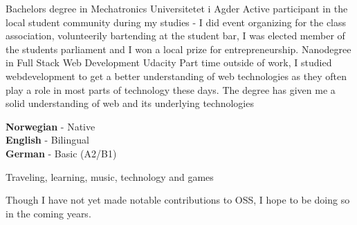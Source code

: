 \documentclass[9pt]{developercv} %
\begin{document}
\begin{entrylist}
	\entry
		{Bachelors degree in Mechatronics}
		{Universitetet i Agder}
    {Active participant in the local student community during my studies - I did event organizing for the class association, volunteerily bartending 
    at the student bar, I was elected member of the students parliament and I won a local
    prize for entrepreneurship.}
	\entry
		{Nanodegree in Full Stack Web Development}
		{Udacity}
		{Part time outside of work, I studied webdevelopment to get a better understanding
    of web technologies as they often play a role in most parts of technology these days.
    The degree has given me a solid understanding of web and its underlying technologies}
\end{entrylist}


\begin{minipage}[t]{0.3\textwidth}
	\vspace{-\baselineskip} %

	\textbf{Norwegian} - Native\\
	\textbf{English} - Bilingual\\
  \textbf{German} - Basic (A2/B1)\\
\end{minipage}
\hfill
\begin{minipage}[t]{0.3\textwidth}
	\vspace{-\baselineskip} %
	
	Traveling, learning, music, technology and games
\end{minipage}
\hfill
\begin{minipage}[t]{0.3\textwidth}
	\vspace{-\baselineskip} %
	
	Though I have not yet made notable contributions to OSS, I hope to be doing so
  in the coming years.
\end{minipage}

\end{document}
